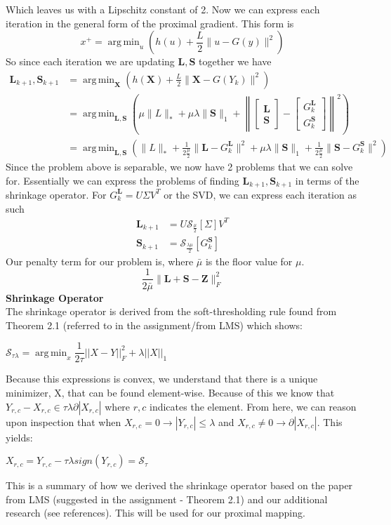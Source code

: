 \documentclass[12pt]{article}
\newcommand{\vL}{{\mathbf{L}}}
\newcommand{\vS}{{\mathbf{S}}}
\newcommand{\vX}{{\mathbf{X}}}
\newcommand{\vZ}{{\mathbf{Z}}}
\DeclareMathOperator*{\argmin}{arg\,min} %
\begin{document}
Which leaves us with a Lipschitz constant of 2. Now we can express each iteration in the general form of the proximal gradient. This form is
$$x^+ = \argmin_u \left( h(u) + \frac{L}{2}\|u-G(y)\|^2\right)$$
So since each iteration we are updating $\vL, \vS$ together we have
\begin{align*}
    \vL_{k+1}, \vS_{k+1} &= \argmin_\vX \left(h(\vX) + \frac{L}{2}\| \vX - G(Y_k)\|^2 \right)\\
    &= \argmin_{\vL, \vS} \left(\mu \|L\|_* + \mu\lambda\|\vS\|_1 + \left\|\begin{bmatrix}\vL\\\vS\end{bmatrix} - \begin{bmatrix}G^\vL_k\\G^\vS_k\end{bmatrix} \right\|^2\right)\\
    &= \argmin_{\vL, \vS} \left(\|L\|_* + \frac{1}{2\frac{\mu}{2}}\|\vL - G^\vL_k\|^2 + \mu\lambda\|\vS\|_1 + \frac{1}{2\frac{\mu}{2}}\|\vS - G^\vS_k\|^2\right)
\end{align*}
Since the problem above is separable, we now have 2 problems that we can solve for. Essentially we can express the problems of finding $\vL_{k+1}, \vS_{k+1}$ in terms of the shrinkage operator. For $G^\vL_k = U\Sigma V^T$ or the SVD, we can express each iteration as such
\begin{align*}
    \vL_{k+1} &= U\mathcal{S}_{\frac{\mu}{2}}[\Sigma]V^T\\
    \vS_{k+1} &= \mathcal{S}_{\frac{\lambda\mu}{2}}[G^\vS_k]
\end{align*}
Our penalty term for our problem is, where $\bar{\mu}$ is the floor value for $\mu$.
$$\frac{1}{2\bar{\mu}} \|\vL + \vS - \vZ\|_F^2$$
\textbf{Shrinkage Operator}\\
The shrinkage operator is derived from the soft-thresholding rule found from Theorem 2.1 (referred to in the assignment/from LMS) which shows:
\begin{center}
    $\mathcal{S}_{\tau \lambda} = \argmin_{x} \dfrac{1}{2 \tau}||X - Y||^2_F + \lambda ||X||_1$
\end{center}
Because this expressions is convex, we understand that there is a unique minimizer, X, that can be found element-wise. Because of this we know that $Y_{r,c} - X_{r, c} \in \tau \lambda \partial|X_{r, c}|$ where $r, c$ indicates the element. From here, we can reason upon inspection that when $X_{r, c} = 0 \rightarrow |Y_{r,c}| \leq \lambda$ and $X_{r, c} \neq 0 \rightarrow \partial |X_{r, c}|$. This yields:
\begin{center}
    $X_{r, c} = Y_{r, c} - \tau \lambda sign(Y_{r, c}) = \mathcal{S}_{\tau}$
\end{center}
This is a summary of how we derived the shrinkage operator based on the paper from LMS (suggested in the assignment - Theorem 2.1) and our additional research (see references). This will be used for our proximal mapping.
\end{document}
